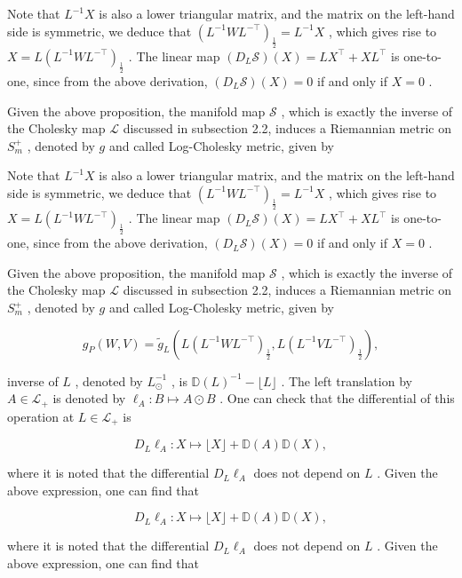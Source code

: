 \documentclass[11pt]{article}
\begin{document}
Note that  $L^{-1}X$  is also a lower triangular matrix, and the matrix on the left-hand side is symmetric, we deduce that  $(L^{-1}WL^{-\top})_{\frac{1}{2}} = L^{-1}X$ , which gives rise to  $X = L(L^{-1}WL^{-\top})_{\frac{1}{2}}$ . The linear map  $(D_L\mathcal{S})(X) = LX^\top +XL^\top$  is one-to-one, since from the above derivation,  $(D_L\mathcal{S})(X) = 0$  if and only if  $X = 0$ .

Given the above proposition, the manifold map  $\mathcal{S}$ , which is exactly the inverse of the Cholesky map  $\mathcal{L}$  discussed in subsection 2.2, induces a Riemannian metric on  $S_{m}^{+}$ , denoted by  $g$  and called Log-Cholesky metric, given by

Note that  $L^{-1}X$  is also a lower triangular matrix, and the matrix on the left-hand side is symmetric, we deduce that  $(L^{-1}WL^{-\top})_{\frac{1}{2}} = L^{-1}X$ , which gives rise to  $X = L(L^{-1}WL^{-\top})_{\frac{1}{2}}$ . The linear map  $(D_L\mathcal{S})(X) = LX^\top +XL^\top$  is one-to-one, since from the above derivation,  $(D_L\mathcal{S})(X) = 0$  if and only if  $X = 0$ .

Given the above proposition, the manifold map  $\mathcal{S}$ , which is exactly the inverse of the Cholesky map  $\mathcal{L}$  discussed in subsection 2.2, induces a Riemannian metric on  $S_{m}^{+}$ , denoted by  $g$  and called Log-Cholesky metric, given by

$$
g _ {P} (W, V) = \tilde {g} _ {L} \left(L \left(L ^ {- 1} W L ^ {- \top}\right) _ {\frac {1}{2}}, L \left(L ^ {- 1} V L ^ {- \top}\right) _ {\frac {1}{2}}\right), \tag {3.1}
$$

inverse of  $L$ , denoted by  $L_{\odot}^{-1}$ , is  $\mathbb{D}(L)^{-1} - \lfloor L\rfloor$ . The left translation by  $A\in \mathcal{L}_{+}$  is denoted by  $\ell_A:B\mapsto A\odot B$ . One can check that the differential of this operation at  $L\in \mathcal{L}_{+}$  is

$$
D _ {L} \ell_ {A}: X \mapsto \lfloor X \rfloor + \mathbb {D} (A) \mathbb {D} (X), \tag {3.2}
$$

where it is noted that the differential  $D_{L}\ell_{A}$  does not depend on  $L$ . Given the above expression, one can find that

$$
D _ {L} \ell_ {A}: X \mapsto \lfloor X \rfloor + \mathbb {D} (A) \mathbb {D} (X), \tag {3.2}
$$

where it is noted that the differential  $D_{L}\ell_{A}$  does not depend on  $L$ . Given the above expression, one can find that
\end{document}

